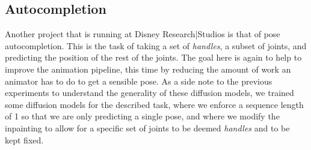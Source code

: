 


\subsection{Autocompletion}
\label{sec:autocomplete}

Another project that is running at Disney Research|Studios is that of pose autocompletion. This is the task of taking a set of \textit{handles}, a subset of joints, and predicting the position of the rest of the joints. The goal here is again to help to improve the animation pipeline, this time by reducing the amount of work an animator has to do to get a sensible pose. As a side note to the previous experiments to understand the generality of these diffusion models, we trained some diffusion models for the described task, where we enforce a sequence length of 1 so that we are only predicting a single pose, and where we modify the inpainting to allow for a specific set of joints to be deemed \textit{handles} and to be kept fixed.

